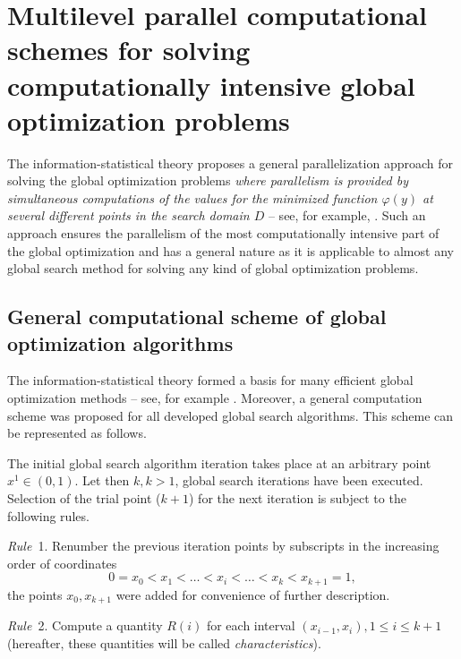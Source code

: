 \documentclass[12pt]{amsart}
\begin{document}
\section{Multilevel parallel computational schemes for solving computationally intensive global optimization problems}

The information-statistical theory proposes a general parallelization approach for solving the global optimization problems \textit{where parallelism is provided by simultaneous computations of the values for the minimized function $\varphi(y)$ at several different points in the search domain $D$} -- see, for example, \cite{Strongin1, Strongin2, Strongin4}. Such an approach ensures the parallelism of the most computationally intensive part of the global optimization and has a general nature as it is applicable to almost any global search method for solving any kind of global optimization problems.


\subsection{General computational scheme of global optimization algorithms}

The information-statistical theory \cite{Strongin1, Strongin3} formed a basis for many efficient global optimization methods -- see, for example \cite{Strongin2, Sergeyev4, Gergel1, Gergel2, Barkalov, Gergel3, Gergel4, Gergel5, Lera}. Moreover, a general computation scheme \cite{Strongin1, Strongin2, Strongin3, Grishagin1, Grishagin2} was proposed for all developed global search algorithms. This scheme can be represented as follows.

The initial global search algorithm iteration takes place at an arbitrary point $x^1 \in (0,1)$. Let then $k, k > 1$, global search iterations have been executed. Selection of the trial point ($k + 1$) for the next iteration is subject to the following rules.

\textit{Rule}~1. Renumber the previous iteration points by subscripts in the increasing order of coordinates
\begin{equation}
0 = x_0 < x_1 < \dots < x_i < \dots < x_k < x_{k+1} = 1,
\end{equation}
the points $x_0, x_{k+1}$ were added for convenience of further description.

\textit{Rule}~2. Compute a quantity $R(i)$ for each interval $(x_{i-1}, x_i), 1 \leq i \leq k + 1$ (hereafter, these quantities will be called \textit{characteristics}).
\end{document}

